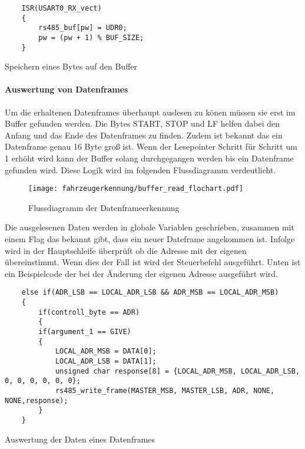 \begin{listing}[H]
    \begin{verbatim}
    ISR(USART0_RX_vect)
    {
        rs485_buf[pw] = UDR0;
        pw = (pw + 1) % BUF_SIZE;
    }   
    \end{verbatim}
    \caption{Speichern eines Bytes auf den Buffer}
\end{listing}

\paragraph{Auswertung von Datenframes}\mbox{} 

Um die erhaltenen Datenframes überhaupt auslesen zu könen müssen sie erst im Buffer gefunden
werden. Die Bytes START, STOP und LF helfen dabei den Anfang und das Ende des Datenframes zu
finden. Zudem ist bekannt das ein Datenframe genau 16 Byte groß ist. Wenn der Lesepointer Schritt
für Schritt um 1 erhöht wird kann der Buffer solang durchgegangen werden bis ein Datenframe
gefunden wird. Diese Logik wird im folgenden Flussdiagramm verdeutlicht.

\begin{figure}[H]
    \centering
    \texttt{[image: fahrzeugerkennung/buffer\_read\_flochart.pdf]}
    \caption{Flussdiagramm der Datenframeerkennung}
\end{figure}

Die ausgelesenen Daten werden in globale Variablen geschrieben, zusammen mit einem Flag
das bekannt gibt, dass ein neuer Dateframe angekommen ist. Infolge wird in der Hauptschleife
überprüft ob die Adresse mit der eigenen übereinstimmt. Wenn dies der Fall ist wird der Steuerbefehl
ausgeführt. Unten ist ein Beispielcode der bei der Änderung der eigenen Adresse ausgeführt wird.
\begin{listing}[H]
    \begin{verbatim}
    else if(ADR_LSB == LOCAL_ADR_LSB && ADR_MSB == LOCAL_ADR_MSB)
    {
        if(controll_byte == ADR)
        {
        if(argument_1 == GIVE)
        {
            LOCAL_ADR_MSB = DATA[0];
            LOCAL_ADR_LSB = DATA[1];
            unsigned char response[8] = {LOCAL_ADR_MSB, LOCAL_ADR_LSB, 0, 0, 0, 0, 0, 0};
            rs485_write_frame(MASTER_MSB, MASTER_LSB, ADR, NONE, NONE,response);
        }
    }  
    \end{verbatim}
    \caption{ Auswertung der Daten eines Datenframes}
\end{listing}



